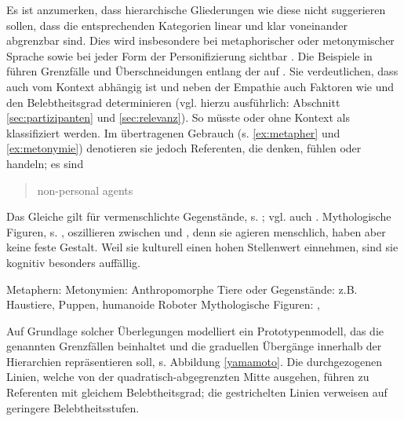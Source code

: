 Es ist anzumerken, dass hierarchische Gliederungen wie diese nicht suggerieren sollen, dass die entsprechenden Kategorien linear und klar voneinander abgrenzbar sind. Dies wird  insbesondere bei metaphorischer  oder metonymischer  Sprache sowie bei jeder Form der Personifizierung sichtbar \parencite[vgl.][62]{Dahl1996}. Die Beispiele in  führen Grenzfälle und Überschneidungen entlang der   auf \parencites()()[basierend auf][62--63]{Dahl1996}[18--20]{Yamamoto1999}. Sie verdeutlichen, dass  auch vom Kontext abhängig ist und neben der Empathie auch Faktoren wie  und  den Belebtheitsgrad  determinieren (vgl. hierzu ausführlich: Abschnitt \ref{sec:partizipanten} und \ref{sec:relevanz}).
So müsste  oder  ohne Kontext als  klassifiziert werden. Im übertragenen Gebrauch (s. \ref{ex:metapher} und \ref{ex:metonymie}) denotieren sie jedoch  Referenten, die denken, fühlen oder handeln; es sind \blockcquote[62]{Dahl1996}{non-personal agents}. Das Gleiche gilt für vermenschlichte Gegenstände, s. ; vgl. auch \textcite[][]{Epley2007}. Mythologische Figuren, s. , oszillieren zwischen   und  , denn sie agieren menschlich, haben aber keine feste Gestalt. Weil sie kulturell einen hohen Stellenwert  einnehmen, sind sie kognitiv besonders auffällig. 
  
\begin{exe}
	\ex \label{ex:borderlines}
	\begin{xlist}
		\ex \label{ex:metapher} Metaphern:  
 		\ex \label{ex:metonymie} Metonymien:  
		\ex \label{ex:anthropo} Anthropomorphe Tiere oder Gegenstände: z.B. Haustiere, Puppen, humanoide Roboter	
		\ex \label{ex:mytho} Mythologische Figuren: , 
	\end{xlist}
\end{exe}
\noindent
Auf Grundlage solcher Überlegungen modelliert \textcite{Yamamoto1999} ein Prototypenmodell, das die genannten Grenzfällen beinhaltet und die graduellen Übergänge innerhalb der Hierarchien  repräsentieren soll, s. Abbildung \ref{yamamoto}. Die durchgezogenen Linien, welche von der quadratisch-abgegrenzten Mitte ausgehen, führen zu Referenten mit gleichem  Belebtheitsgrad; die gestrichelten Linien verweisen auf geringere  Belebtheitsstufen.

